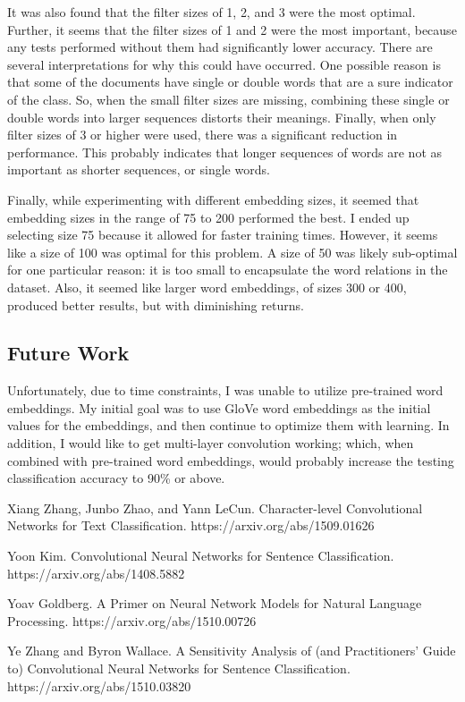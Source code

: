 \documentclass{article}
\begin{document}
It was also found that the filter sizes of 1, 2, and 3 were the most optimal. Further, it seems that the filter sizes of 1 and 2 were the most
important, because any tests performed without them had significantly lower accuracy. There are several interpretations for why this could
have occurred. One possible reason is that some of the documents have single or double words that are a sure indicator of the class. So, when the
small filter sizes are missing, combining these single or double words into larger sequences distorts their meanings. Finally, when only filter sizes
of 3 or higher were used, there was a significant reduction in performance. This probably indicates that longer sequences of words are not as
important as shorter sequences, or single words.

Finally, while experimenting with different embedding sizes, it seemed that embedding sizes in the range of 75 to 200 performed the best. I ended up
selecting size 75 because it allowed for faster training times. However, it seems like a size of 100 was optimal for this problem. A size of
50 was likely sub-optimal for one particular reason: it is too small to encapsulate the word relations in the dataset. Also, it seemed like
larger word embeddings, of sizes 300 or 400, produced better results, but with diminishing returns.

\subsection{Future Work}
Unfortunately, due to time constraints, I was unable to utilize pre-trained word embeddings. My initial goal was to use GloVe word embeddings as
the initial values for the embeddings, and then continue to optimize them with learning. In addition, I would like to get
multi-layer convolution working; which, when combined with pre-trained word embeddings, would probably increase the testing classification accuracy
to 90\% or above.

\begin{thebibliography}{9}

Xiang Zhang, Junbo Zhao, and Yann LeCun.  Character-level Convolutional Networks for Text Classification.
https://arxiv.org/abs/1509.01626

Yoon Kim.  Convolutional Neural Networks for Sentence Classification.
https://arxiv.org/abs/1408.5882

Yoav Goldberg. A Primer on Neural Network Models for Natural Language Processing.
https://arxiv.org/abs/1510.00726

Ye Zhang and Byron Wallace. A Sensitivity Analysis of (and Practitioners' Guide to) Convolutional Neural Networks for Sentence Classification.
https://arxiv.org/abs/1510.03820

\end{thebibliography}
\end{document}
